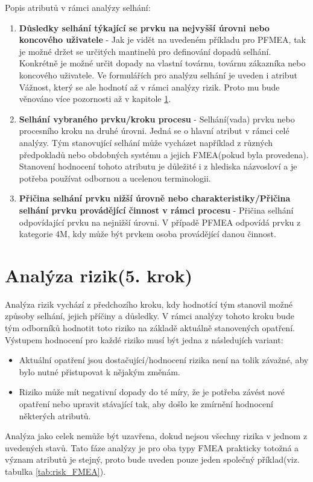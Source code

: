 \clearpage
Popis atributů v rámci analýzy selhání:
\begin{enumerate}
	\item \textbf{Důsledky selhání týkající se prvku na  nejvyšší úrovni nebo koncového uživatele } -  Jak je vidět na uvedeném příkladu pro PFMEA, tak je možné držet se určitých mantinelů pro definování dopadů selhání. Konkrétně je možné určit dopady na vlastní továrnu, továrnu zákazníka nebo koncového uživatele. Ve formulářích pro analýzu selhání je uveden i atribut Vážnost, který se ale hodnotí až v rámci analýzy rizik. Proto mu bude věnováno více pozornosti až v kapitole \ref{sec:FMEA_postup_5}.
	\item \textbf{Selhání vybraného prvku/kroku procesu} - Selhání(vada) prvku nebo procesního kroku na druhé úrovni. Jedná se o hlavní atribut v rámci celé analýzy. Tým stanovující  selhání může vycházet například z různých předpokladů nebo obdobných systému a jejich FMEA(pokud byla provedena). Stanovení hodnocení tohoto atributu je důležité i z hlediska názvosloví a je potřeba používat odbornou a ucelenou terminologii.  
	\item \textbf{Přičina selhání prvku nižší úrovně nebo charakteristiky/Přičina selhání prvku provádějící činnost v rámci procesu} - Přičina selhání odpovídající prvku na nejnižší úrovni. V případě PFMEA odpovídá prvku z kategorie 4M, kdy může být prvkem osoba provádějící danou činnost. 
\end{enumerate}


\section{Analýza rizik(5. krok)}
\label{sec:FMEA_postup_5}
Analýza rizik vychází z předchozího kroku, kdy hodnotící tým stanovil možné způsoby selhání, jejich příčiny a důsledky. V rámci analýzy tohoto kroku bude tým odborníků hodnotit toto riziko na základě aktuálně stanovených opatření. Výstupem hodnocení pro každé riziko musí být jedna z následujích variant:
\begin{itemize}
	\item Aktuální opatření jsou dostačující/hodnocení rizika není na tolik závažné, aby bylo nutné přistupovat k nějakým změnám. 
    \item Riziko může mít negativní dopady do té míry, že je potřeba závést nové opatření nebo upravit stávající tak, aby došlo ke zmírnění hodnocení některých atributů.
\end{itemize}
Analýza jako celek nemůže být uzavřena, dokud nejsou všechny rizika v jednom z uvedených stavů. Tato fáze analýzy je pro oba typy FMEA prakticky totožná a význam atributů je stejný, proto bude uveden pouze jeden společný příklad(viz. tabulka \ref{tab:risk_FMEA}).

